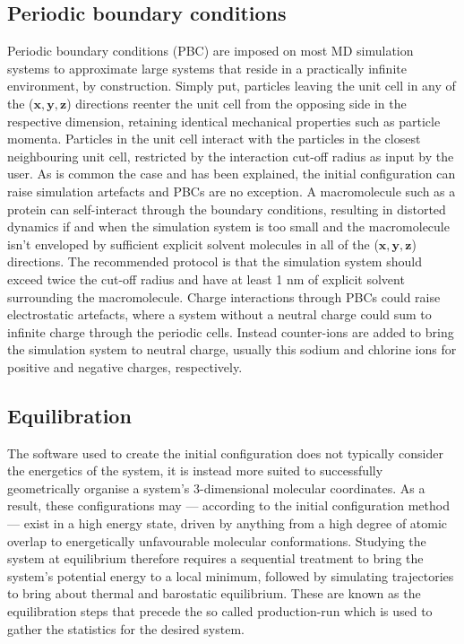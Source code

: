 \subsection{Periodic boundary conditions}
Periodic boundary conditions (PBC) are imposed on most MD simulation systems to approximate large systems that reside in a practically infinite environment, by construction. Simply put, particles leaving the unit cell in any of the ($\mathbf{x,y,z}$) directions reenter the unit cell from the opposing side in the respective dimension, retaining identical mechanical properties such as particle momenta. Particles in the unit cell interact with the particles in the closest neighbouring unit cell, restricted by the interaction cut-off radius as input by the user. As is common the case and has been explained, the initial configuration can raise simulation artefacts and PBCs are no exception. A macromolecule such as a protein can self-interact through the boundary conditions, resulting in distorted dynamics if and when the simulation system is too small and the macromolecule isn't enveloped by sufficient explicit solvent molecules in all of the ($\mathbf{x,y,z}$) directions. The recommended protocol is that the simulation system should exceed twice the cut-off radius and have at least 1 nm of explicit solvent surrounding the macromolecule.\cite{deSouza1997} Charge interactions through PBCs could raise electrostatic artefacts, where a system without a neutral charge could sum to infinite charge through the periodic cells. Instead counter-ions are added to bring the simulation system to neutral charge, usually this sodium and chlorine ions for positive and negative charges, respectively. 

\subsection{Equilibration} \label{sec:equilibration}
The software used to create the initial configuration does not typically consider the energetics of the system, it is instead more suited to successfully geometrically organise a system's 3-dimensional molecular coordinates. As a result, these configurations may --- according to the initial configuration method --- exist in a high energy state, driven by anything from a high degree of atomic overlap to energetically unfavourable molecular conformations. Studying the system at equilibrium therefore requires a sequential treatment to bring the system's potential energy to a local minimum, followed by simulating trajectories to bring about thermal and barostatic equilibrium. These are known as the equilibration steps that precede the so called production-run which is used to gather the statistics for the desired system. 

